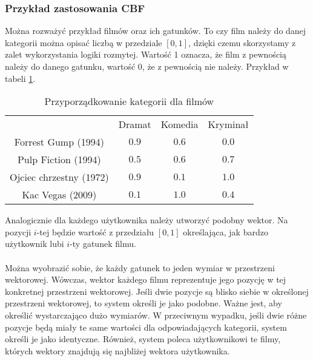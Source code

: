 \documentclass{article}
\begin{document}
\subsubsection{Przykład zastosowania CBF}
Można rozważyć przykład filmów oraz ich gatunków. To czy film należy do danej kategorii można opisać liczbą w przedziale $[0, 1]$, dzięki czemu skorzystamy z zalet wykorzystania logiki rozmytej. Wartość 1 oznacza, że film z pewnością należy do danego gatunku, wartość 0, że z pewnością nie należy. Przykład w tabeli \ref{tab:film_genre}. 
\begin{table}[]
    \centering
    \begin{tabular}{c|c|c|c}
         & Dramat & Komedia & Kryminał \\
        Forrest Gump (1994) & $0.9$ & $0.6$ & $0.0$ \\
        Pulp Fiction (1994) & $0.5$ & $0.6$ & $0.7$ \\
        Ojciec chrzestny (1972) & $0.9$ & $0.1$ & $1.0$ \\
        Kac Vegas (2009) & $0.1$ & $1.0$ & $0.4$ \\
    \end{tabular}
    \caption{Przyporządkowanie kategorii dla filmów}
    \label{tab:film_genre}
\end{table}
Analogicznie dla każdego użytkownika należy utworzyć podobny wektor. Na pozycji $i$-tej będzie wartość z przedziału $[0, 1]$ określająca, jak bardzo użytkownik lubi $i$-ty gatunek filmu. \\ \\
Można wyobrazić sobie, że każdy gatunek to jeden wymiar w przestrzeni wektorowej. Wówczas, wektor każdego filmu reprezentuje jego pozycję w tej konkretnej przestrzeni wektorowej. Jeśli dwie pozycje są blisko siebie w określonej przestrzeni wektorowej, to system określi je jako podobne. Ważne jest, aby określić wystarczająco dużo wymiarów. W przeciwnym wypadku, jeśli dwie różne pozycje będą miały te same wartości dla odpowiadających kategorii, system określi je jako identyczne. Również, system poleca użytkownikowi te filmy, których wektory znajdują się najbliżej wektora użytkownika. 
\end{document}
